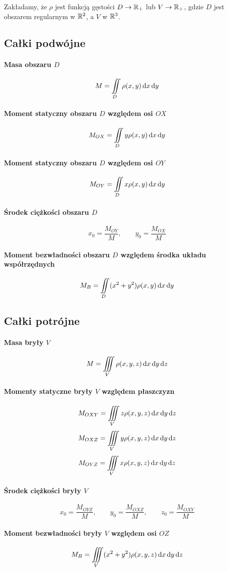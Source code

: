Zakładamy, że $\rho$ jest funkcją gęstości $D \to \mathbb R_+$ lub $V \to \mathbb R_+$, gdzie $D$ jest obszarem regularnym w $\mathbb R^2$, a $V$ w $\mathbb R^3$.

\subsection*{Całki podwójne}

\paragraph*{Masa obszaru $D$}
\[ M = \iint\limits_D \rho(x, y) \operatorname{d}\!{x} \operatorname{d}\!{y} \]

\paragraph*{Moment statyczny obszaru $D$ względem osi $OX$}
\[ M_{OX} = \iint\limits_D y\rho(x, y) \operatorname{d}\!{x} \operatorname{d}\!{y} \]

\paragraph*{Moment statyczny obszaru $D$ względem osi $OY$}
\[ M_{OY} = \iint\limits_D x\rho(x, y) \operatorname{d}\!{x} \operatorname{d}\!{y} \]

\paragraph*{Środek ciężkości obszaru $D$}
\[ x_0 = \frac{M_{OY}}{M}, \qquad y_0 = \frac{M_{OX}}{M} \]

\paragraph*{Moment bezwładności obszaru $D$ względem środka układu współrzędnych}
\[ M_B = \iint\limits_D (x^2 + y^2) \rho(x, y) \operatorname{d}\!{x} \operatorname{d}\!{y} \]

\subsection*{Całki potrójne}

\paragraph*{Masa bryły $V$}
\[ M = \iiint\limits_V \rho(x, y, z) \operatorname{d}\!{x} \operatorname{d}\!{y} \operatorname{d}\!{z} \]

\paragraph*{Momenty statyczne bryły $V$ względem płaszczyzn}
\[ M_{OXY} = \iiint\limits_V z\rho(x, y, z) \operatorname{d}\!{x} \operatorname{d}\!{y} \operatorname{d}\!{z} \]
\[ M_{OXZ} = \iiint\limits_V y\rho(x, y, z) \operatorname{d}\!{x} \operatorname{d}\!{y} \operatorname{d}\!{z} \]
\[ M_{OYZ} = \iiint\limits_V x\rho(x, y, z) \operatorname{d}\!{x} \operatorname{d}\!{y} \operatorname{d}\!{z} \]

\paragraph*{Środek ciężkości bryły $V$}
\[ x_0 = \frac{M_{OYZ}}{M}, \qquad y_0 = \frac{M_{OXZ}}{M}, \qquad z_0 = \frac{M_{OXY}}{M} \]

\paragraph*{Moment bezwładności bryły $V$ względem osi $OZ$}
\[ M_B = \iiint\limits_V (x^2 + y^2) \rho(x, y, z) \operatorname{d}\!{x} \operatorname{d}\!{y} \operatorname{d}\!{z} \]